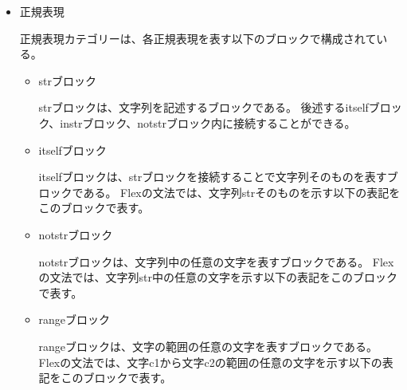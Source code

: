 \documentclass{risepaper}
\begin{document}
\begin{itemize}
\item 正規表現

正規表現カテゴリーは、各正規表現を表す以下のブロックで構成されている。

\begin{itemize}
\item strブロック

strブロックは、文字列を記述するブロックである。
後述するitselfブロック、instrブロック、notstrブロック内に接続することができる。

\end{itemize}

\begin{itemize}
\item itselfブロック

itselfブロックは、strブロックを接続することで文字列そのものを表すブロックである。
Flexの文法では、文字列strそのものを示す以下の表記をこのブロックで表す。


\end{itemize}

\begin{itemize}
\item notstrブロック

notstrブロックは、文字列中の任意の文字を表すブロックである。
Flexの文法では、文字列str中の任意の文字を示す以下の表記をこのブロックで表す。

\shadowbox{
\begin{minipage}[t]{4cm}
\begin{verbatim}
[str]
\end{verbatim}
\end{minipage}
}

\end{itemize}

\begin{itemize}
\item rangeブロック

rangeブロックは、文字の範囲の任意の文字を表すブロックである。
Flexの文法では、文字c1から文字c2の範囲の任意の文字を示す以下の表記をこのブロックで表す。

\shadowbox{
\begin{minipage}[t]{4cm}
\begin{verbatim}
[c1-c2]
\end{verbatim}
\end{minipage}
}


\end{itemize}
\end{itemize}
\end{document}
